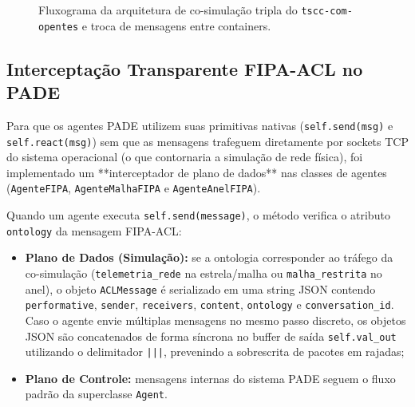 \documentclass[10pt,twocolumn,a4paper]{article}
\begin{document}
\begin{figure}[H]
{%
}
\caption{Fluxograma da arquitetura de co-simulação tripla do \texttt{tscc-com-opentes} e troca de mensagens entre containers.}
\label{fig:arquitetura_tikz}
\end{figure}

\subsection{Interceptação Transparente FIPA-ACL no PADE}

Para que os agentes PADE utilizem suas primitivas nativas (\texttt{self.send(msg)} e \texttt{self.react(msg)}) sem que as mensagens trafeguem diretamente por sockets TCP do sistema operacional (o que contornaria a simulação de rede física), foi implementado um **interceptador de plano de dados** nas classes de agentes (\texttt{AgenteFIPA}, \texttt{AgenteMalhaFIPA} e \texttt{AgenteAnelFIPA}).

Quando um agente executa \texttt{self.send(message)}, o método verifica o atributo \texttt{ontology} da mensagem FIPA-ACL:
\begin{itemize}
    \item \textbf{Plano de Dados (Simulação):} se a ontologia corresponder ao tráfego da co-simulação (\texttt{telemetria\_rede} na estrela/malha ou \texttt{malha\_restrita} no anel), o objeto \texttt{ACLMessage} é serializado em uma string JSON contendo \texttt{performative}, \texttt{sender}, \texttt{receivers}, \texttt{content}, \texttt{ontology} e \texttt{conversation\_id}. Caso o agente envie múltiplas mensagens no mesmo passo discreto, os objetos JSON são concatenados de forma síncrona no buffer de saída \texttt{self.val\_out} utilizando o delimitador \texttt{|||}, prevenindo a sobrescrita de pacotes em rajadas;
    \item \textbf{Plano de Controle:} mensagens internas do sistema PADE seguem o fluxo padrão da superclasse \texttt{Agent}.
\end{itemize}
\end{document}
